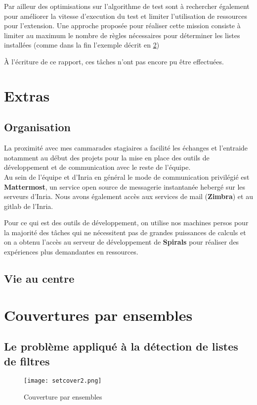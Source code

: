 \documentclass[oneside,a4paper,12pt]{article}
\begin{document}
Par ailleur des optimisations sur l'algorithme de test sont à rechercher également pour améliorer la vitesse d'execution du test et limiter l'utilisation de ressources pour l'extension. Une approche proposée pour réaliser cette mission consiste à limiter au maximum le nombre de règles nécessaires pour déterminer les listes installées (comme dans la fin l'exemple décrit en \ref{setcover})

\`A l'écriture de ce rapport, ces tâches n'ont pas encore pu être effectuées.

\section{Extras}

\subsection{Organisation}

La proximité avec mes cammarades stagiaires a facilité les échanges et l'entraide notamment au début des projets pour la mise en place des outils de développement et de communication avec le reste de l'équipe.\\

Au sein de l'équipe et d'Inria en général le mode de communication privilégié est \textbf{Mattermost}, un service open source de messagerie instantanée hebergé sur les serveurs d'Inria. Nous avons également accès aux services de mail (\textbf{Zimbra}) et au gitlab de l'Inria.

Pour ce qui est des outils de développement, on utilise nos machines persos pour la majorité des tâches qui ne nécessitent pas de grandes puissances de calculs et on a obtenu l'accès au serveur de développement de \textbf{Spirals} pour réaliser des expériences plus demandantes en ressources.

\subsection{Vie au centre}



\newpage

\appendix

\section{Couvertures par ensembles}\label{setcover}
\subsection{Le problème appliqué à la détection de listes de filtres}
\begin{figure}[h]
	\centering
	\texttt{[image: setcover2.png]}
	\caption{Couverture par ensembles}
\end{figure}
\end{document}

